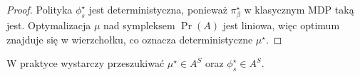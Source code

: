 \begin{proof}
Polityka $\phi_s^\star$ jest deterministyczna, ponieważ $\pi_\beta^\star$ w klasycznym MDP taką jest. Optymalizacja $\mu$ nad sympleksem $\Pr(A)$ jest liniowa, więc optimum znajduje się w wierzchołku, co oznacza deterministyczne $\mu^\star$.
\end{proof}

W praktyce wystarczy przeszukiwać $\mu^\star \in A^S$ oraz $\phi_s^\star \in A^S$.